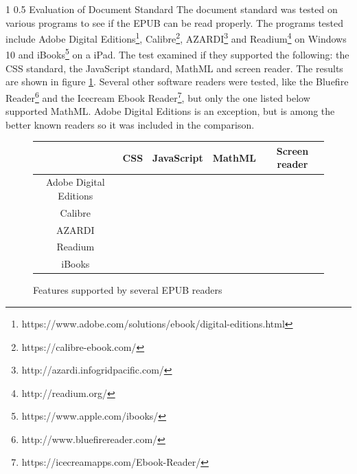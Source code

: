 \documentclass{llncs}
\makeatletter
\newcommand{\cmark}{\ding{51}}%
\newcommand{\xmark}{\ding{55}}%
\renewcommand\section{\@startsection 
   {section}{1}{0mm}%
   {1\baselineskip}%
   {0.5\baselineskip}%
   {\bfseries\Large}%
   }
\makeatother
\begin{document}


\section{Evaluation of Document Standard}
The document standard was tested on various programs to see if the EPUB can be read properly. The programs tested include Adobe Digital Editions\footnote{https://www.adobe.com/solutions/ebook/digital-editions.html}, Calibre\footnote{https://calibre-ebook.com/}, AZARDI\footnote{http://azardi.infogridpacific.com/} and Readium\footnote{http://readium.org/} on Windows 10 and iBooks\footnote{https://www.apple.com/ibooks/} on a iPad. The test examined if they supported the following: the CSS standard, the JavaScript standard, MathML and screen reader. The results are shown in figure \ref{fig:table}. Several other software readers were tested, like the Bluefire Reader\footnote{http://www.bluefirereader.com/} and the Icecream Ebook Reader\footnote{https://icecreamapps.com/Ebook-Reader/}, but only the one listed below supported MathML. Adobe Digital Editions is an exception, but is among the better known readers so it was included in the comparison.

\begin{figure}
	\centering
	\begin{tabular}{| c | c | c | c | c |}
		\hline
		& CSS & JavaScript & MathML & Screen reader \\ \hline
		Adobe Digital Editions & \xmark & \xmark & \xmark & \cmark \\ \hline
		Calibre & \xmark & \cmark & \cmark & \xmark \\ \hline
		AZARDI & \xmark & \xmark & \cmark & \cmark \\ \hline
		Readium & \cmark & \xmark & \cmark & \cmark \\ \hline
		iBooks & \xmark & \xmark & \cmark & \cmark \\
		\hline
	\end{tabular}
	\caption{Features supported by several EPUB readers}

\label{fig:table}
\end{figure}
\end{document}
